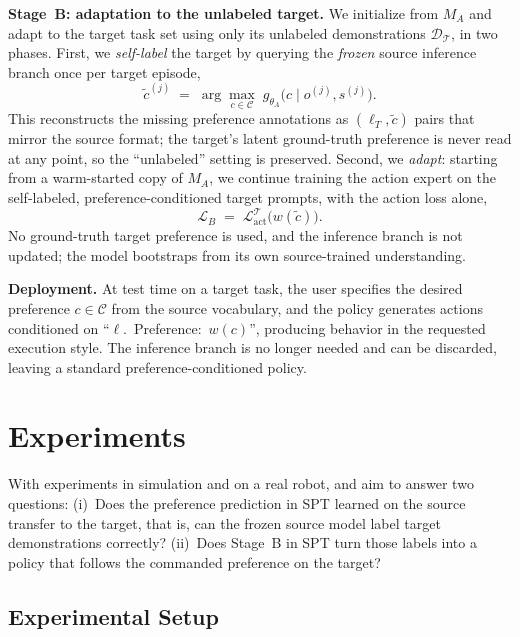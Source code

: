 \documentclass{article}
\begin{document}
\textbf{Stage~B: adaptation to the unlabeled target.}
We initialize from $M_A$ and adapt to the target task set using only its unlabeled demonstrations $\mathcal{D}_{\mathcal{T}}$, in two phases.
First, we \emph{self-label} the target by querying the \emph{frozen} source inference branch once per target episode,
\begin{equation}
  \tilde{c}^{(j)} \;=\; \arg\max_{c\in\mathcal{C}}\; g_{\theta_A}\!\big(c \mid o^{(j)},s^{(j)}\big).
  \label{eq:pseudolabel}
\end{equation}
This reconstructs the missing preference annotations as $(\ell_T,\tilde{c})$ pairs
that mirror the source format; the target's latent ground-truth preference is
never read at any point, so the ``unlabeled'' setting is preserved.
Second, we \emph{adapt}: starting from a warm-started copy of $M_A$, we continue
training the action expert on the self-labeled, preference-conditioned target
prompts, with the action loss alone,
\begin{equation}
  \mathcal{L}_{B} \;=\; \mathcal{L}^{\mathcal{T}}_{\mathrm{act}}\!\big(w(\tilde{c})\big).
  \label{eq:stageB}
\end{equation}
No ground-truth target preference is used, and the inference branch is not
  updated; the model bootstraps from its own source-trained understanding.

\textbf{Deployment.}
At test time on a target task, the user specifies the desired preference
$c\in\mathcal{C}$ from the source vocabulary, and the policy generates actions
conditioned on ``$\ell$.~Preference:~$w(c)$'', producing behavior in the
requested execution style. The inference branch is no longer needed and can be
discarded, leaving a standard preference-conditioned policy.




\section{Experiments}
\label{sec:experiments}

With experiments in simulation and on a real robot, and aim to answer two questions:
(i)~Does the preference prediction in SPT learned on the source transfer to the target,
that is, can the frozen source model label target demonstrations correctly?
(ii)~Does Stage~B in SPT turn those labels into a policy that follows the commanded
preference on the target?

\subsection{Experimental Setup}
\label{sec:setup}
\end{document}
